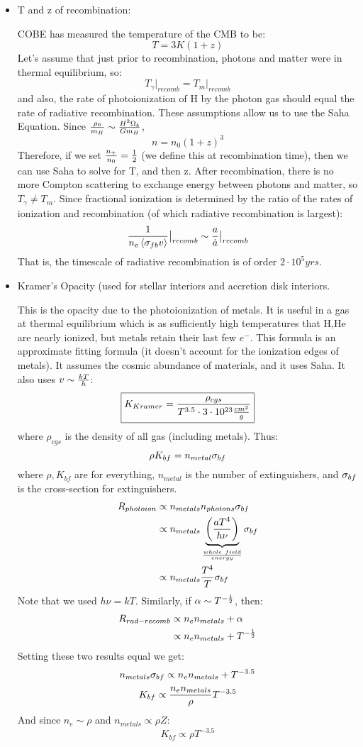\documentclass[11pt]{article}
\def\.{\dot}
\def\hf{{1 \over 2}}
\def\inv#1{{1 \over #1}}
\def\mean#1{\left\langle #1\right\rangle}
\def\eval#1{\big|_{#1}}
\def\e#1{\cdot10^{#1}}
\begin{document}
\begin{itemize}
\item  T and z of recombination:\par
COBE has measured the temperature of the CMB to be:
$$T=3K(1+z)$$
Let's assume that just prior to recombination, photons and matter were
in thermal equilibrium, so:
$$T_\gamma\eval{recomb}=T_m\eval{recomb}$$
and also, the rate of photoionization of H by the photon gas should equal
the rate of radiative recombination.  These assumptions allow us to use the
Saha Equation.  Since ${\rho_0\over m_H}\sim{H^2\Omega_b\over Gm_H}$,
$$n=n_0(1+z)^3$$
Therefore, if we set ${n_+\over n_0}=\hf$ (we define this at recombination
time), then we can use Saha to solve for T, and then z.  After recombination,
there is no more Compton scattering to exchange energy between photons and
matter, so $T_\gamma\ne T_m$.  Since fractional ionization is determined by the
ratio of the rates of ionization and recombination (of which radiative
recombination is largest):
$$\inv{n_e\mean{\sigfb v}}\eval{recomb}\sim{a\over\.a}\eval{recomb}$$
That is, the timescale of radiative recombination is of order $2\e5yrs$.

\item  Kramer's Opacity (used for stellar interiors and accretion disk
interiors.\par
This is the opacity due to the photoionization of metals.  It is useful
in a gas at thermal equilibrium which is as sufficiently high temperatures
that H,He are nearly ionized, but metals retain their last few $e^-$.  This
formula is an approximate fitting formula (it doesn't account for the ionization
edges of metals).  It assumes the cosmic abundance of materials, and it
uses Saha.  It also uses $v\sim{kT\over h}$:
$$\boxed{K_{Kramer}={\rho_{cgs}\over T^{3.5}\cdot3\e{23}{cm^2\over g}}}$$
where $\rho_{cgs}$ is the density of all gas (including metals). Thus:
$$\rho K_{bf}=n_{metal}\sigma_{bf}$$
where $\rho,K_{bf}$ are for everything, $n_{metal}$ is the number of
extinguishers, and $\sigma_{bf}$ is the cross-section for extinguishers.
\def\nmet{n_{metals}}
$$\begin{aligned}R_{photoion}&\propto\nmet n_{photons}\sigbf\\ 
&\propto\nmet\underbrace{\left({aT^4\over h\nu}\right)}_{whole\ field\over
energy}\sigbf\\ 
&\propto\nmet{T^4\over T}\sigbf\\ \end{aligned}$$
Note that we used $h\nu=kT$.  Similarly, if $\alpha\sim T^{-\hf}$, then:
$$\begin{aligned}R_{rad-recomb}&\propto n_e\nmet+\alpha\\ 
&\propto n_e\nmet+T^{-\hf}\\ \end{aligned}$$
Setting these two results equal we get:
$$\nmet\sigbf\propto n_e\nmet+T^{-3.5}$$
$$K_{bf}\propto{n_e\nmet\over\rho} T^{-3.5}$$
And since $n_e\sim\rho$ and $\nmet\propto\rho Z$:
$$K_{bf}\propto\rho T^{-3.5}$$
\end{itemize}
\end{document}
